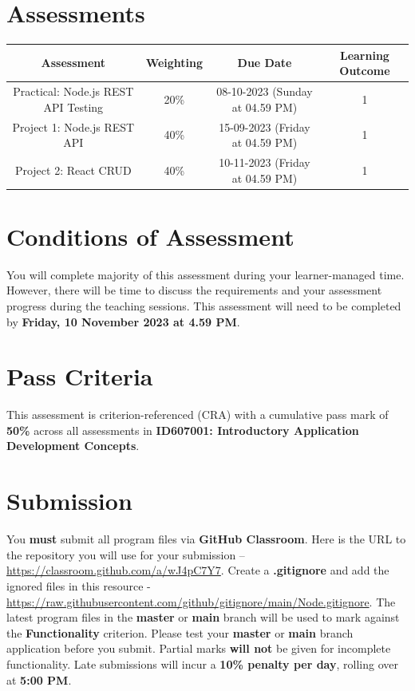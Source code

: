 \documentclass{article}
\begin{document}
\section*{Assessments}
\renewcommand{\arraystretch}{1.5}
\begin{tabular}{|c|c|c|c|}
	\hline
	\textbf{Assessment}                                 & \textbf{Weighting} & \textbf{Due Date}            & \textbf{Learning Outcome} \\ \hline
	\small Practical: Node.js REST API Testing & \small 20\%        & \small 08-10-2023 (Sunday at 04.59 PM)   & \small 1                   \\ \hline
	\small Project 1: Node.js REST API                  & \small 40\%        & \small 15-09-2023 (Friday at 04.59 PM) \small  & \small 1                   \\ \hline
	\small Project 2: React CRUD                        & \small 40\%        & \small 10-11-2023 (Friday at 04.59 PM)  & \small 1                   \\ \hline
\end{tabular}


\section*{Conditions of Assessment}
You will complete majority of this assessment during your learner-managed time. However, there will be time to discuss the requirements and your assessment progress during the teaching sessions. This assessment will need to be completed by \textbf{Friday, 10 November 2023 at 4.59 PM}.

\section*{Pass Criteria}
This assessment is criterion-referenced (CRA) with a cumulative pass mark of \textbf{50\%} across all assessments in \textbf{ID607001: Introductory Application Development Concepts}.

\section*{Submission}
You \textbf{must} submit all program files via \textbf{GitHub Classroom}. Here is the URL to the repository you will use for your submission – \href{https://classroom.github.com/a/wJ4pC7Y7}{https://classroom.github.com/a/wJ4pC7Y7}. Create a \textbf{.gitignore} and add the ignored files in this resource - \href{https://raw.githubusercontent.com/github/gitignore/main/Node.gitignore}{https://raw.githubusercontent.com/github/gitignore/main/Node.gitignore}. The latest program files in the \textbf{master} or \textbf{main} branch will be used to mark against the \textbf{Functionality} criterion. Please test your \textbf{master} or \textbf{main} branch application before you submit. Partial marks \textbf{will not} be given for incomplete functionality. Late submissions will incur a \textbf{10\% penalty per day}, rolling over at \textbf{5:00 PM}.
\end{document}
